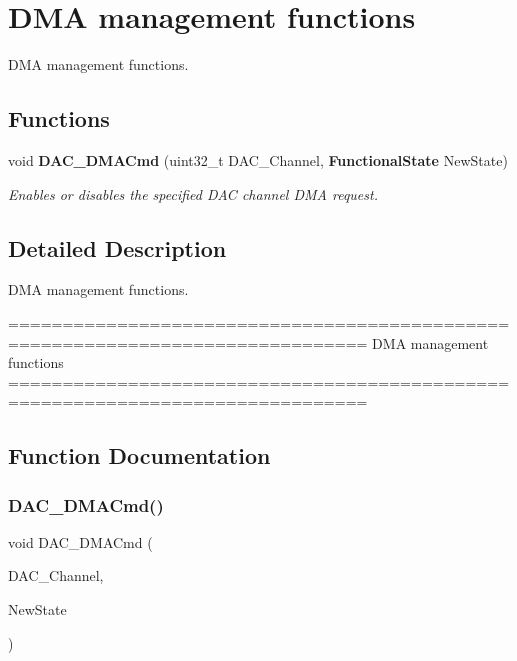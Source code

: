 \section{D\+MA management functions}
\label{group__DAC__Group2}


D\+MA management functions.  


\subsection*{Functions}
\begin{DoxyCompactItemize}
\item 
void \textbf{ D\+A\+C\+\_\+\+D\+M\+A\+Cmd} (uint32\+\_\+t D\+A\+C\+\_\+\+Channel, \textbf{ Functional\+State} New\+State)
\begin{DoxyCompactList}\small\item\em Enables or disables the specified D\+AC channel D\+MA request. \end{DoxyCompactList}\end{DoxyCompactItemize}


\subsection{Detailed Description}
D\+MA management functions. 

\begin{DoxyVerb} ===============================================================================
                          DMA management functions
 ===============================================================================  \end{DoxyVerb}
 

\subsection{Function Documentation}
\mbox{\label{group__DAC__Group2_ga194cba38f60ace11658824f0250121f4}} 
\subsubsection{D\+A\+C\+\_\+\+D\+M\+A\+Cmd()}
{\footnotesize\ttfamily void D\+A\+C\+\_\+\+D\+M\+A\+Cmd (\begin{DoxyParamCaption}\item[{uint32\+\_\+t}]{D\+A\+C\+\_\+\+Channel,  }\item[{\textbf{ Functional\+State}}]{New\+State }\end{DoxyParamCaption})}




